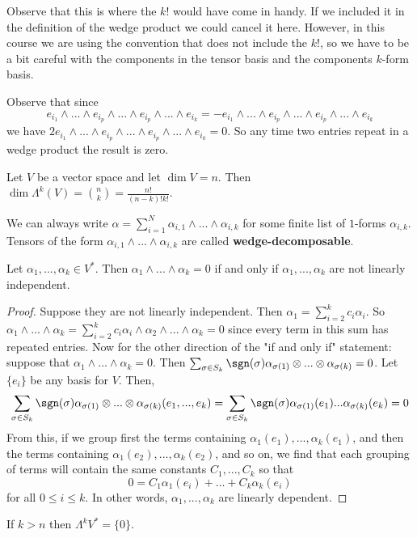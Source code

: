 \begin{remark*}
    Observe that this is where the $k!$ would have come in handy. If we included it in the definition of the wedge product we could cancel it here. However, in this course we are using the convention that does not include the $k!$, so we have to be a bit careful with the components in the tensor basis and the components $k$-form basis.
\end{remark*}
Observe that since 
\[e_{i_1}\wedge...\wedge e_{i_p}\wedge...\wedge e_{i_p}\wedge...\wedge e_{i_k} = -e_{i_1}\wedge...\wedge e_{i_p}\wedge...\wedge e_{i_p}\wedge...\wedge e_{i_k}\]
we have $2e_{i_1}\wedge...\wedge e_{i_p}\wedge...\wedge e_{i_p}\wedge...\wedge e_{i_k} =0$. So any time two entries repeat in a wedge product the result is zero. 
\begin{cor}
Let $V$ be a vector space and let $\dim V = n$. Then
    $\dim \Lambda^k (V) = \binom{n}{k} = \frac{n!}{(n-k)!k!}$.
\end{cor}
\begin{cor}
     We can always write $\alpha = \sum_{i=1}^N \alpha_{i,1}\wedge...\wedge \alpha_{i,k}$ for some finite list of $1$-forms $\alpha_{i,k}$. Tensors of the form $\alpha_{i,1}\wedge...\wedge \alpha_{i,k}$ are called \textbf{wedge-decomposable}.
\end{cor}

\begin{cor} Let $\alpha_1,...,\alpha_k \in V^*$. Then $\alpha_1\wedge...\wedge \alpha_k = 0$ if and only if $\alpha_1,...,\alpha_k$ are not linearly independent.
\end{cor}
\begin{proof}Suppose they are not linearly independent. Then $\alpha_1 = \sum_{i=2}^k c_i \alpha_i$. So $\alpha_1\wedge...\wedge \alpha_k = \sum_{i=2}^k c_i \alpha_i \wedge \alpha_2 \wedge...\wedge \alpha_k = 0$ since every term in this sum has repeated entries. Now for the other direction of the "if and only if" statement: suppose that $\alpha_1\wedge...\wedge \alpha_k = 0$. Then $\sum_{\sigma\in S_k} \sgn(\sigma)\alpha_{\sigma(1)}\otimes...\otimes \alpha_{\sigma(k)}=0$. Let $\{e_i\}$ be any basis for $V$. Then,
\[\sum_{\sigma\in S_k} \sgn(\sigma)\alpha_{\sigma(1)}\otimes...\otimes \alpha_{\sigma(k)}(e_1,...,e_k)=\sum_{\sigma\in S_k} \sgn(\sigma)\alpha_{\sigma(1)}(e_1)... \alpha_{\sigma(k)}(e_k)=0\]
From this, if we group first the terms containing $\alpha_1(e_1),...,\alpha_k(e_1)$, and then the terms containing $\alpha_1(e_2),...,\alpha_k(e_2)$, and so on, we find that each grouping of terms will contain the same constants $C_1,...,C_k$ so that
\[0 = C_1\alpha_1(e_i) + ... + C_k \alpha_k(e_i)\]
for all $0\leq i \leq k$. In other words, $\alpha_1,...,\alpha_k$ are linearly dependent. \end{proof}
\begin{cor} If $k > n$ then $\Lambda^k V^* = \{0\}$.
\end{cor}

